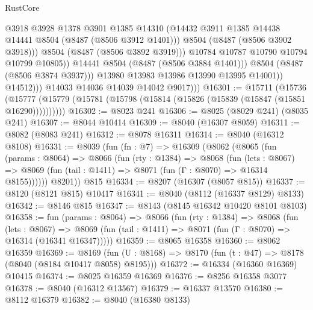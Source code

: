 \begin{lexlean}{RustCore}
\begin{coremodule}
                                @3918
                                @3928
                                @1378
                                @3901
                                @1385
                                @14310
                                (@14432 @3911 @1385 @14438 @14441 @8504 (@8487 (@8506 @3912 @1401)))
                                @8504
                                (@8487 (@8506 @3902 @3918)))
                              @8504
                              (@8487 (@8506 @3892 @3919)))
                            @10784
                            @10787
                            @10790
                            @10794
                            @10799
                            @10805))
                        @14441
                        @8504
                        (@8487 (@8506 @3884 @1401)))
                      @8504
                      (@8487 (@8506 @3874 @3937)))
                    @13980
                    @13983
                    @13986
                    @13990
                    @13995
                    @14001))
                @14512)))
          @14033
          @14036
          @14039
          @14042
          @9017)))
@16301 := @15711
    (@15736 (@15777 (@15779 (@15781 (@15798 (@15814 (@15826 (@15839 (@15847 (@15851 @16290))))))))))
@16302 := @8023 @241
@16306 := @8025 (@8029 @241) (@8035 @241)
@16307 := @8044 @10414
@16309 := @8040 (@16307 @8059)
@16311 := @8082 (@8083 @241)
@16312 := @8078 @16311
@16314 := @8040 (@16312 @8108)
@16331 := @8039
    (fun (fn : @7) =>
    @16309
      (@8062
        (@8065
          (fun (params : @8064) =>
          @8066
            (fun (rty : @1384) =>
            @8068
              (fun (lets : @8067) =>
              @8069 (fun (tail : @1411) => @8071 (fun (Γ : @8070) => @16314 @8155))))))
        @8201))
    @815
@16334 := @8207 (@16307 (@8057 @815))
@16337 := @8120 (@8121 @815) @10417
@16341 := @8040 (@8112 (@16337 @8129) @8133)
@16342 := @8146 @815
@16347 := @8143 (@8145 @16342 @10420 @8101 @8103)
@16358 := fun (params : @8064) =>
  @8066
    (fun (rty : @1384) =>
    @8068
      (fun (lets : @8067) =>
      @8069 (fun (tail : @1411) => @8071 (fun (Γ : @8070) => @16314 (@16341 @16347)))))
@16359 := @8065 @16358
@16360 := @8062 @16359
@16369 := @8169
    (fun (U : @8168) => @8170 (fun (t : @47) => @8178 (@8040 (@8184 @10417 @8058) @8195)))
@16372 := @16334 (@16360 @16369) @10415
@16374 := @8025 @16359 @16369
@16376 := @8256 @16358 @3077
@16378 := @8040 (@16312 @13567)
@16379 := @16337 @13570
@16380 := @8112 @16379
@16382 := @8040 (@16380 @8133)

\end{coremodule}
\end{lexlean}
